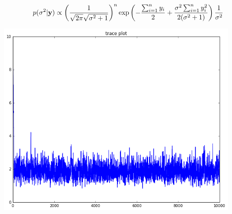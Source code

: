 \documentclass{article}
\begin{document}
	\subsection{}
		\begin{align*}
			p(\sigma^2 | {\bf y}) \propto \left(\frac{1}{\sqrt{2\pi}\sqrt{\sigma^2 + 1}}\right)^{n} \exp \left( -\frac{\sum_{i=1}^{n} y_i}{2} + \frac{\sigma^2 \sum_{i=1}^{n} y_i^2}{2(\sigma^2 + 1)}\right) \frac{1}{\sigma^2}
		\end{align*}
		
		\begin{center}
		\includegraphics[width = 12cm]{1-b.png}
		\end{center}
\end{document}

